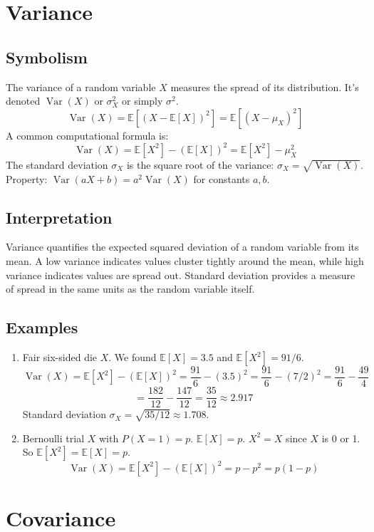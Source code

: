 \documentclass{article}
\newcommand{\E}{\mathbb{E}}    %
\DeclareMathOperator{\Var}{Var} %
\begin{document}
\section{Variance}

\subsection*{Symbolism}
The variance of a random variable $X$ measures the spread of its distribution. It's denoted $\Var(X)$ or $\sigma^2_X$ or simply $\sigma^2$.
\[ \Var(X) = \E[(X - \E[X])^2] = \E[(X - \mu_X)^2] \]
A common computational formula is:
\[ \Var(X) = \E[X^2] - (\E[X])^2 = \E[X^2] - \mu_X^2 \]
The standard deviation $\sigma_X$ is the square root of the variance: $\sigma_X = \sqrt{\Var(X)}$.
Property: $\Var(aX + b) = a^2 \Var(X)$ for constants $a, b$.

\subsection*{Interpretation}
Variance quantifies the expected squared deviation of a random variable from its mean. A low variance indicates values cluster tightly around the mean, while high variance indicates values are spread out. Standard deviation provides a measure of spread in the same units as the random variable itself.

\subsection*{Examples}
\begin{enumerate}
    \item Fair six-sided die $X$. We found $\E[X]=3.5$ and $\E[X^2]=91/6$.
    \[ \Var(X) = \E[X^2] - (\E[X])^2 = \frac{91}{6} - (3.5)^2 = \frac{91}{6} - (7/2)^2 = \frac{91}{6} - \frac{49}{4} \]
    \[ = \frac{182}{12} - \frac{147}{12} = \frac{35}{12} \approx 2.917 \]
    Standard deviation $\sigma_X = \sqrt{35/12} \approx 1.708$.
    \item Bernoulli trial $X$ with $P(X=1)=p$. $\E[X]=p$. $X^2=X$ since $X$ is 0 or 1. So $\E[X^2] = \E[X] = p$.
    \[ \Var(X) = \E[X^2] - (\E[X])^2 = p - p^2 = p(1-p) \]
\end{enumerate}

\section{Covariance}
\end{document}

